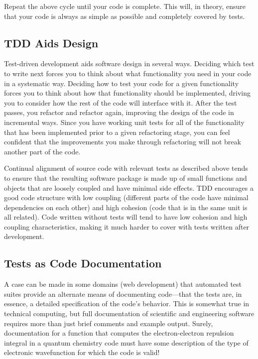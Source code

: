 Repeat the above cycle until your code is complete. This will, in theory, ensure that your code is
always as simple as possible and completely covered by tests. 

\subsection{TDD Aids Design}
Test-driven development aids software design in several ways. Deciding which test to write next forces you
to think about what functionality you need in your code in a systematic way. Deciding how to test your code for
a given functionality forces you to think about how that functionality should be implemented, driving you to 
consider how the rest of the code will interface with it. After the test passes, you refactor and refactor again,
improving the design of the code in incremental ways. Since you have working unit tests for all of the functionality
that has been implemented prior to a given refactoring stage, you can feel confident that the improvements you make
through refactoring will not break another part of the code.

Continual alignment of source code with relevant tests as described above tends to ensure that the resulting 
software package is made up of small functions and objects that are loosely coupled and have minimal side effects.
TDD encourages a good code structure with low coupling (different parts of the code have minimal dependencies
on each other) and high cohesion (code that is in the same unit is all related). Code written without tests will
tend to have low cohesion and high coupling characteristics, making it much harder to cover with tests
written after development.

\subsection{Tests as Code Documentation}
A case can be made in some domains (\eg web development) that automated test suites 
provide an alternate means of documenting code---that
the tests are, in essence, a detailed specification of the code's behavior. This is somewhat true in
technical computing, but full documentation of scientific and engineering software requires 
more than just brief comments and example output. Surely, documentation for a function that computes 
the electron-electron repulsion integral in a quantum chemistry code must have some description
of the type of electronic wavefunction for which the code is valid! 

